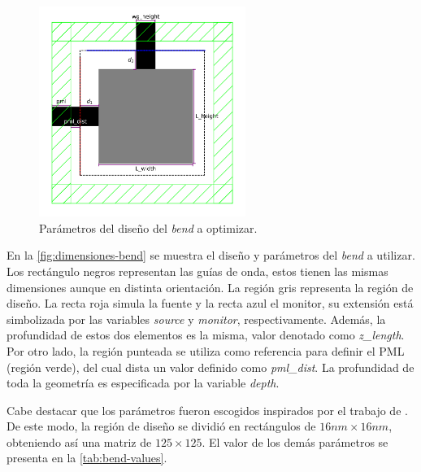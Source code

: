 \begin{figure}[ht]
  \centering
  \includegraphics[width=0.6\textwidth]{image/proposal/bend.png}
  \caption{Parámetros del diseño del \emph{bend} a optimizar.}
  \label{fig:dimensiones-bend}
\end{figure}

En la \autoref{fig:dimensiones-bend} se muestra el diseño y parámetros del \emph{bend} a utilizar.
Los rectángulo negros representan las guías de onda, estos tienen las mismas dimensiones aunque en distinta orientación.
La región gris representa la región de diseño.
La recta roja simula la fuente y la recta azul el monitor, su extensión está
simbolizada por las variables \emph{source} y \emph{monitor}, respectivamente.
Además, la profundidad de estos dos elementos es la misma, valor denotado como \emph{z\_length}.
Por otro lado, la región punteada se utiliza como referencia para definir el PML (región verde),
del cual dista un valor definido como \emph{pml\_dist}. 
La profundidad de toda la geometría es especificada por la variable \emph{depth}.

Cabe destacar que los parámetros fueron escogidos inspirados por el trabajo de \cite{Su2020}.
De este modo, la región de diseño se dividió en rectángulos de $16nm \times 16 nm$, obteniendo así una
matriz de $125 \times 125$.
El valor de los demás parámetros se presenta en la \autoref{tab:bend-values}.

